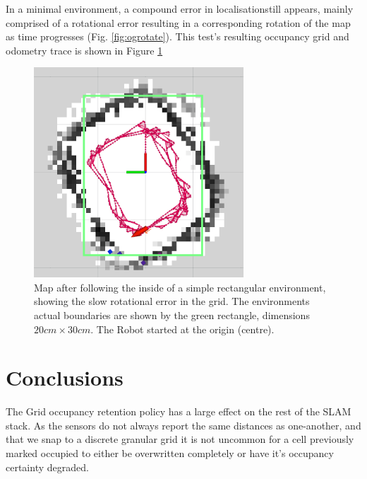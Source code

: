 \documentclass[11pt, a4paper]{article}
\begin{document}
In a minimal environment, a compound error in localisationstill appears, mainly comprised of
a rotational error resulting in a corresponding rotation of the map as time progresses 
(Fig. \ref{fig:ogrotate}). This test's
resulting occupancy grid and odometry trace is shown in Figure \ref{fig:simplefail}
 
\begin{figure}[H]
	  \centering
	  \includegraphics[width=0.7\textwidth]{../assets/SLAM/failtrial3.png}
          \caption{
            \label{fig:simplefail}
            Map after following the inside of a simple rectangular environment, showing
            the slow rotational error in the grid. The environments actual boundaries are shown 
            by the green rectangle, dimensions $20cm \times 30cm$. The Robot started at the 
            origin (centre).
          }
\end{figure}





\section{Conclusions}
\label{sec:conclusion}

The Grid occupancy retention policy has a large effect on the rest of the SLAM stack.
As the sensors do not always report the same distances as one-another, and that we snap
to a discrete granular grid it is not uncommon for a cell previously marked occupied to either 
be overwritten completely or have it's occupancy certainty degraded.
\end{document}
